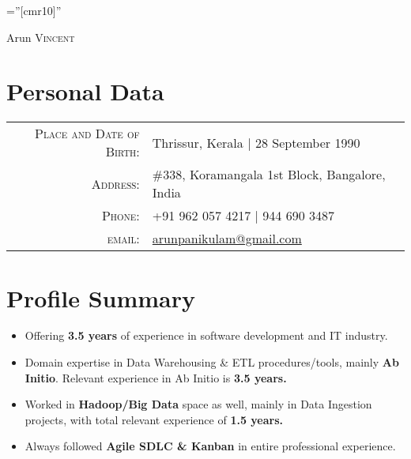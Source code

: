 \documentclass[a4paper,10pt]{article}
\begin{document}

\pagestyle{empty} %

\font\fb=''[cmr10]'' %

\par{\centering
		{\Huge Arun \textsc{Vincent}
	}\bigskip\par}

\section{Personal Data}

\begin{tabular}{rl}
    \textsc{Place and Date of Birth:} & Thrissur, Kerala  | 28 September 1990 \\
    \textsc{Address:}   & \#338, Koramangala 1st Block, Bangalore, India \\
    \textsc{Phone:}     & +91 962 057 4217 | 944 690 3487\\
    \textsc{email:}     & \href{mailto:arunpanikulam@gmail.com}{arunpanikulam@gmail.com}
\end{tabular}

\section{Profile Summary }
\begin{itemize}
\item Offering \textbf{3.5 years} of experience in software development and IT industry.
\item Domain expertise in Data Warehousing \& ETL procedures/tools, mainly \textbf{Ab Initio}. Relevant experience in Ab Initio is \textbf{3.5 years.}
\item Worked in \textbf{Hadoop/Big Data} space as well, mainly in Data Ingestion projects, with total relevant experience of \textbf{1.5 years.}
\item Always followed \textbf{Agile SDLC \& Kanban} in entire professional experience.
\end{itemize}
\end{document}
